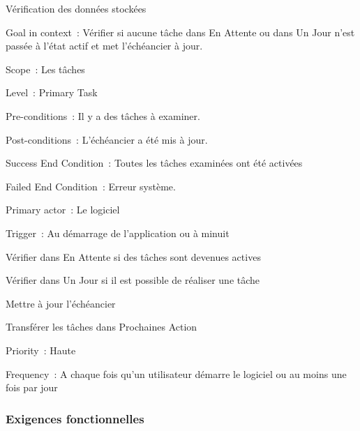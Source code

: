 \begin{usecase}{Vérification des données stockées}
\begin{information}
\item[Goal in context~:] Vérifier si aucune tâche dans En Attente ou dans Un Jour n'est passée à l'état actif  et met l'échéancier à jour.
\item[Scope~:] Les tâches
\item[Level~:] Primary Task
\item[Pre-conditions~:] Il y a des tâches à examiner.
\item[Post-conditions~:] L'échéancier a été mis à jour.
\item[Success End Condition~:] Toutes les tâches examinées ont été activées
\item[Failed End Condition~:] Erreur système.
\item[Primary actor~:] Le logiciel
\item[Trigger~:] Au démarrage de l'application ou à minuit
\\
\end{information}
\begin{scenario}
\item Vérifier dans En Attente si des tâches sont devenues actives
\item Vérifier dans Un Jour si il est possible de réaliser une tâche
\item Mettre à jour l'échéancier
\item Transférer les tâches dans Prochaines Action
\\
\end{scenario}
\begin{relatedinformation}
\item[Priority~:] Haute
\item[Frequency~:] A chaque fois qu'un utilisateur démarre le logiciel ou au moins une fois par jour
\\
\end{relatedinformation}
\end{usecase}

\subsubsection{Exigences fonctionnelles}

